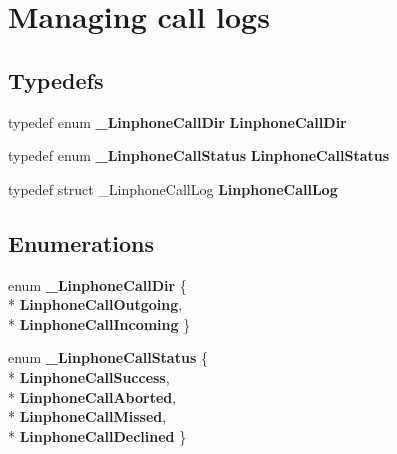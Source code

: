 \section{Managing call logs}
\label{group__call__logs}
\subsection*{Typedefs}
\begin{DoxyCompactItemize}
\item 
typedef enum {\bf \-\_\-\-Linphone\-Call\-Dir} {\bf Linphone\-Call\-Dir}
\item 
typedef enum {\bf \-\_\-\-Linphone\-Call\-Status} {\bf Linphone\-Call\-Status}
\item 
typedef struct \-\_\-\-Linphone\-Call\-Log {\bf Linphone\-Call\-Log}
\end{DoxyCompactItemize}
\subsection*{Enumerations}
\begin{DoxyCompactItemize}
\item 
enum {\bf \-\_\-\-Linphone\-Call\-Dir} \{ \\*
{\bf Linphone\-Call\-Outgoing}, 
\\*
{\bf Linphone\-Call\-Incoming}
 \}
\item 
enum {\bf \-\_\-\-Linphone\-Call\-Status} \{ \\*
{\bf Linphone\-Call\-Success}, 
\\*
{\bf Linphone\-Call\-Aborted}, 
\\*
{\bf Linphone\-Call\-Missed}, 
\\*
{\bf Linphone\-Call\-Declined}
 \}
\end{DoxyCompactItemize}

